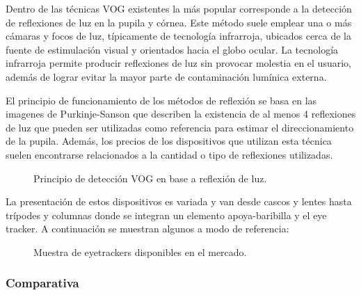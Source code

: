 \documentclass[../main.tex]{subfiles}
\begin{document}
\begin{enumerate}
					Dentro de las técnicas VOG existentes la más popular corresponde a la detección de reflexiones de luz en la pupila y córnea. Este método suele emplear una o más cámaras y focos de luz, típicamente de tecnología infrarroja, ubicados cerca de la fuente de estimulación visual y orientados hacia el globo ocular. La tecnología infrarroja permite producir reflexiones de luz sin provocar molestia en el usuario, además de lograr evitar la mayor parte de contaminación lumínica externa. 

					El principio de funcionamiento de los métodos de reflexión se basa en las imagenes de Purkinje-Sanson que describen la existencia de al menos 4 reflexiones de luz que pueden ser utilizadas como referencia para estimar el direccionamiento de la pupila. Además, los precios de los dispositivos que utilizan esta técnica suelen encontrarse relacionados a la cantidad o tipo de reflexiones utilizadas.
					\begin{figure}[H]
						\centering
						\hspace{5mm}
						\caption{Principio de detección VOG en base a reflexión de luz\cite{dissertation:eyetrackers}.}
						\label{fig:02_et_vog1}
					\end{figure}

					La presentación de estos dispositivos es variada y van desde cascos y lentes hasta trípodes y columnas donde se integran un elemento apoya-baribilla y el eye tracker. A continuación se muestran algunos a modo de referencia:
					\begin{figure}[H]
						\centering
						\hspace{5mm}
						\caption{Muestra de eyetrackers disponibles en el mercado.}
						\label{fig:02_et_vog2}
					\end{figure}  

				\end{enumerate}

			\subsubsection{Comparativa}
			\label{ssub:02_comparativa_eyetracker}
\end{document}
